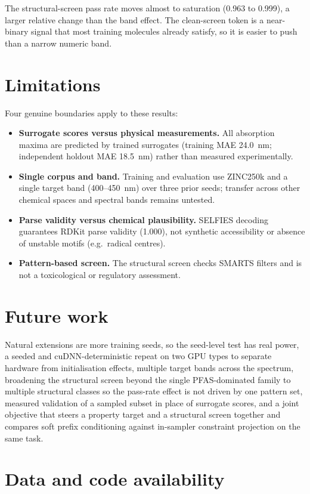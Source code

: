 \documentclass[11pt]{article}
\begin{document}
The structural-screen pass rate moves almost to saturation (0.963 to 0.999), a larger
relative change than the band effect. The clean-screen token is a near-binary signal that
most training molecules already satisfy, so it is easier to push than a narrow numeric
band.

\section{Limitations}
\label{sec:limitations}

Four genuine boundaries apply to these results:
\begin{itemize}
  \item \textbf{Surrogate scores versus physical measurements.} All absorption maxima are predicted by trained surrogates (training MAE 24.0~nm; independent holdout MAE 18.5~nm) rather than measured experimentally.
  \item \textbf{Single corpus and band.} Training and evaluation use ZINC250k and a single target band (400--450~nm) over three prior seeds; transfer across other chemical spaces and spectral bands remains untested.
  \item \textbf{Parse validity versus chemical plausibility.} SELFIES decoding guarantees RDKit parse validity (1.000), not synthetic accessibility or absence of unstable motifs (e.g.\ radical centres).
  \item \textbf{Pattern-based screen.} The structural screen checks SMARTS filters and is not a toxicological or regulatory assessment.
\end{itemize}

\section{Future work}

Natural extensions are more training seeds, so the seed-level test has real power, a
seeded and cuDNN-deterministic repeat on two GPU types to separate hardware from
initialisation effects, multiple
target bands across the spectrum, broadening the structural screen beyond the single
PFAS-dominated family to multiple structural classes so the pass-rate effect is not
driven by one pattern set, measured validation of a sampled subset in place of surrogate
scores, and a joint objective that steers a property target and a structural screen
together and compares soft prefix conditioning against in-sampler constraint projection on
the same task.

\section*{Data and code availability}
\end{document}
